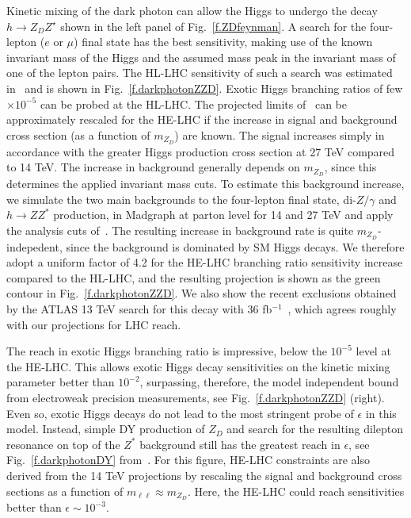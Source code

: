Kinetic mixing of the dark photon can allow the Higgs to undergo the decay $h \to Z_D Z^{\star}$ shown in the left panel of Fig.~\ref{f.ZDfeynman}. A search for the four-lepton ($e$ or $\mu$) final state has the best sensitivity, making use of the known invariant mass of the Higgs and the assumed mass peak in the invariant mass of one of the lepton pairs. The HL-LHC sensitivity of such a search was estimated in~\cite{Curtin:2014cca} and is shown in Fig.~\ref{f.darkphotonZZD}. 
%
Exotic Higgs branching ratios of few$\times 10^{-5}$ can be probed at the HL-LHC. 
%
The projected limits of~\cite{Curtin:2014cca} can be approximately rescaled for the HE-LHC if the increase in signal and background cross section (as a function of $m_{Z_D}$) are known. 
%
The signal increases simply in accordance with the greater Higgs production cross section at 27 TeV compared to 14 TeV.
%
The increase in background generally depends on $m_{Z_D}$, since this determines the applied invariant mass cuts. To estimate this background increase, we simulate the two main backgrounds to the four-lepton final state, di-$Z/\gamma$ and $h \to Z Z^*$ production, in Madgraph at parton level for 14 and 27 TeV and apply the analysis cuts of~\cite{Curtin:2014cca}.
%
The resulting increase in background rate is quite $m_{Z_D}$-indepedent, since the background is dominated by SM Higgs decays. We therefore adopt a uniform factor of 4.2  for the HE-LHC branching ratio sensitivity increase compared to the HL-LHC, and the resulting projection is shown as the green contour in Fig.~\ref{f.darkphotonZZD}.
%
We also show the recent exclusions obtained by the ATLAS 13 TeV search for this decay with 36 fb$^{-1}$~\cite{Aaboud:2018fvk}, which agrees roughly with our projections for LHC reach. 


The reach in exotic Higgs branching ratio is impressive, below the $10^{-5}$ level at the HE-LHC.
This allows exotic Higgs decay sensitivities on the kinetic mixing parameter better than $10^{-2}$, surpassing, therefore, the model independent bound from electroweak precision measurements, %
see Fig.~\ref{f.darkphotonZZD} (right). 
%
Even so, exotic Higgs decays do not lead to the most stringent probe of $\epsilon$ in this model. Instead, simple DY production of $Z_D$ and search for the resulting dilepton resonance on top of the $Z^*$ background still has the greatest reach in $\epsilon$, see Fig.~\ref{f.darkphotonDY} from~\cite{Curtin:2014cca}. For this figure, HE-LHC constraints are also derived from the 14 TeV projections by rescaling the signal and background cross sections as a function of $m_{\ell \ell} \approx m_{Z_D}$. Here, the HE-LHC could reach sensitivities better than $\epsilon \sim 10^{-3}$. 

